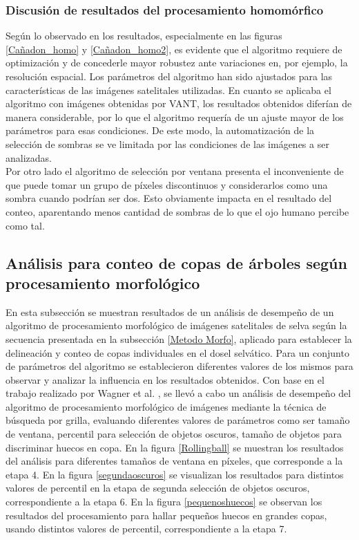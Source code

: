 \subsubsection{Discusión de resultados del procesamiento homomórfico}
Según lo observado en los resultados, especialmente en las figuras \ref{Cañadon_homo} y \ref{Cañadon_homo2}, es evidente que el algoritmo requiere de optimización y de concederle mayor robustez ante variaciones en, por ejemplo, la resolución espacial. Los parámetros del algoritmo han sido ajustados para las características de las imágenes satelitales utilizadas. En cuanto se aplicaba el algoritmo con imágenes obtenidas por VANT, los resultados obtenidos diferían de manera considerable, por lo que el algoritmo requería de un ajuste mayor de los parámetros para esas condiciones. De este modo, la automatización de la selección de sombras se ve limitada por las condiciones de las imágenes a ser analizadas.\\
Por otro lado el algoritmo de selección por ventana presenta el inconveniente de que puede tomar un grupo de píxeles discontinuos y considerarlos como una sombra cuando podrían ser dos. Esto obviamente impacta en el resultado del conteo, aparentando menos cantidad de sombras de lo que el ojo humano percibe como tal.                                                                                                                              

\subsection{Análisis para conteo de copas de árboles según procesamiento morfológico} \label{resultados morfologico}
En esta subsección se muestran resultados de un análisis de desempeño de un algoritmo de procesamiento morfológico de imágenes satelitales de selva según la secuencia presentada en la subsección \ref{Metodo Morfo}, aplicado para establecer la delineación y conteo de copas individuales en el dosel selvático. Para un conjunto de parámetros del algoritmo se establecieron diferentes valores de los mismos para observar y analizar la influencia en los resultados obtenidos.
Con base en el trabajo realizado por Wagner et al. \cite{hubert_wagner_individual_2018}, se llevó a cabo un análisis de desempeño del algoritmo de procesamiento morfológico de imágenes mediante la técnica de búsqueda por grilla, evaluando diferentes valores de parámetros como ser tamaño de ventana, percentil para selección de objetos oscuros, tamaño de objetos para discriminar huecos en copa. En la figura \ref{Rollingball} se muestran los resultados del análisis para diferentes tamaños de ventana en  píxeles, que corresponde a la etapa 4. En la figura \ref{segundaoscuros} se visualizan los resultados para distintos valores de percentil en la etapa de segunda selección de objetos oscuros, correspondiente a la etapa 6. En la figura \ref{pequenoshuecos} se observan los resultados del procesamiento para hallar pequeños huecos en grandes copas, usando distintos valores de percentil, correspondiente a la etapa 7. 

